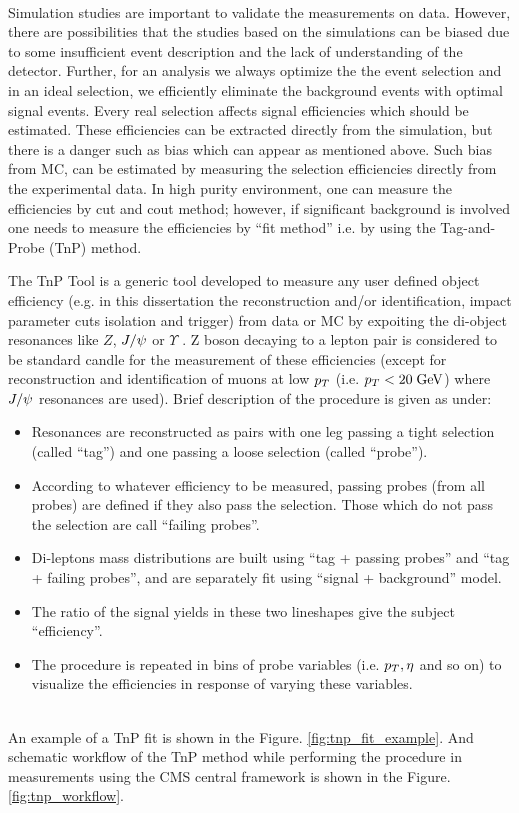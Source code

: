\label{tnp_procedure}\\
\par Simulation studies are important to validate the measurements on data. However, there are possibilities that the studies based on the
simulations can be biased due to some insufficient event description and the lack of understanding of the detector.
Further, for an analysis we always optimize the the event selection and in an ideal selection, we efficiently eliminate the background events with optimal signal events. 
Every real selection affects signal efficiencies which should be estimated.
These efficiencies can be extracted directly from the simulation, but there is a danger such as bias which can appear as mentioned above.
Such bias from MC,  can be estimated by measuring the selection efficiencies directly from the experimental data.
In high purity environment, one can measure the efficiencies by cut and cout method; however, if significant background is involved one needs to measure the efficiencies by  ``fit method'' i.e. by using the Tag-and-Probe (TnP) method. 

The TnP Tool is a generic tool developed to measure any user defined object efficiency (e.g. in this dissertation the reconstruction and/or identification, impact parameter cuts isolation and trigger) from data or MC by expoiting the di-object resonances like $Z$, $J/\psi$ or $\Upsilon$ \cite{pog_tnp}. %
Z boson decaying to a lepton pair is considered to be standard candle for the measurement of these efficiencies (except for reconstruction and identification of  muons at low $p_T$ (i.e. $p_T<20 \hbox{$\;\hbox{\rm GeV}$}$) where $J/\psi$ resonances are used). 
Brief description of the procedure is given as under:

\begin{itemize}
\item Resonances are reconstructed as pairs with one leg passing a tight selection (called ``tag'') and one passing a loose selection (called ``probe'').
\item According to whatever efficiency to be measured, passing probes (from all probes) are defined if they also pass the selection. Those which do not pass the selection are call ``failing probes''.
\item Di-leptons mass distributions are built using ``tag + passing probes'' and ``tag + failing probes'', and are separately fit using ``signal + background'' model.
\item The ratio of the signal yields in these two lineshapes give the subject ``efficiency''.
\item The procedure is repeated in bins of probe variables (i.e. $p_T, \eta$ and so on) to visualize the efficiencies in response of varying these variables.
\end{itemize}
\\
An example of a TnP fit is shown in the Figure. \ref{fig:tnp_fit_example}. And schematic workflow of the TnP method while performing the procedure in measurements using the CMS central framework is shown in the Figure. \ref{fig:tnp_workflow}.

